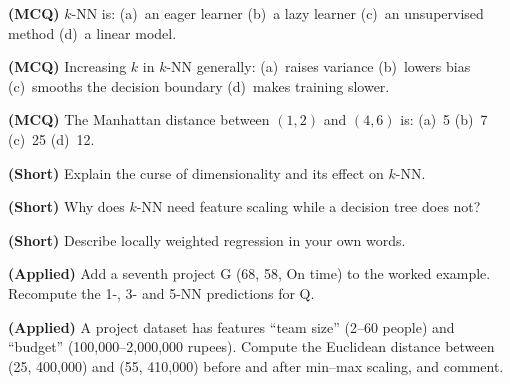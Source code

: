 \begin{reviewq}
  \item \textbf{(MCQ)} $k$-NN is: (a)~an eager learner (b)~a lazy learner
        (c)~an unsupervised method (d)~a linear model.
  \item \textbf{(MCQ)} Increasing $k$ in $k$-NN generally: (a)~raises variance
        (b)~lowers bias (c)~smooths the decision boundary (d)~makes training
        slower.
  \item \textbf{(MCQ)} The Manhattan distance between $(1, 2)$ and $(4, 6)$ is:
        (a)~5 (b)~7 (c)~25 (d)~12.
  \item \textbf{(Short)} Explain the curse of dimensionality and its effect on
        $k$-NN.
  \item \textbf{(Short)} Why does $k$-NN need feature scaling while a decision tree
        does not?
  \item \textbf{(Short)} Describe locally weighted regression in your own words.
  \item \textbf{(Applied)} Add a seventh project G (68, 58, On time) to the worked
        example. Recompute the 1-, 3- and 5-NN predictions for Q.
  \item \textbf{(Applied)} A project dataset has features ``team size'' (2--60
        people) and ``budget'' (100{,}000--2{,}000{,}000 rupees). Compute the
        Euclidean distance between (25, 400{,}000) and (55, 410{,}000) before and
        after min--max scaling, and comment.
\end{reviewq}
